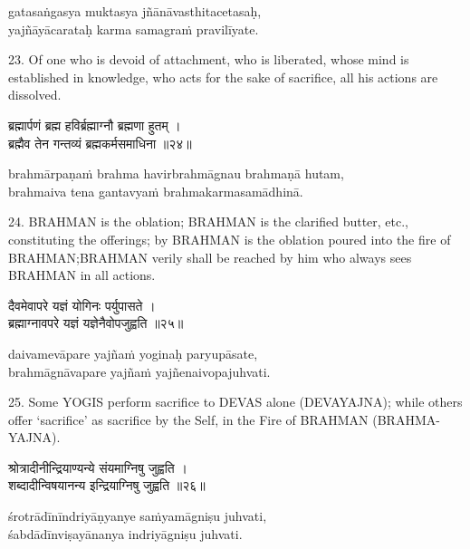 \begin{transliteration}
gatasaṅgasya muktasya jñānāvasthitacetasaḥ, \\
yajñāyācarataḥ karma samagraṁ pravilīyate.
\end{transliteration}

23. Of one who is devoid of attachment, who is liberated, whose mind is
established in knowledge, who acts for the sake of sacrifice, all his actions
are dissolved.

\begin{gitaverse}
ब्रह्मार्पणं ब्रह्म हविर्ब्रह्माग्नौ ब्रह्मणा हुतम् । \\
ब्रह्मैव तेन गन्तव्यं ब्रह्मकर्मसमाधिना ॥२४॥
\end{gitaverse}

\begin{transliteration}
brahmārpaṇaṁ brahma havirbrahmāgnau brahmaṇā hutam, \\
brahmaiva tena gantavyaṁ brahmakarmasamādhinā.
\end{transliteration}

24. BRAHMAN is the oblation; BRAHMAN is the clarified butter, etc.,
constituting the offerings; by BRAHMAN is the oblation poured into the fire of
BRAHMAN;\@ BRAHMAN verily shall be reached by him who always sees BRAHMAN in
all actions.

\begin{gitaverse}
दैवमेवापरे यज्ञं योगिनः पर्युपासते । \\
ब्रह्माग्नावपरे यज्ञं यज्ञेनैवोपजुह्वति ॥२५॥
\end{gitaverse}

\begin{transliteration}
daivamevāpare yajñaṁ yoginaḥ paryupāsate, \\
brahmāgnāvapare yajñaṁ yajñenaivopajuhvati.
\end{transliteration}

25. Some YOGIS perform sacrifice to DEVAS alone (DEVAYAJNA); while others offer
`sacrifice' as sacrifice by the Self, in the Fire of BRAHMAN (BRAHMA-YAJNA).

\begin{gitaverse}
श्रोत्रादीनीन्द्रियाण्यन्ये संयमाग्निषु जुह्वति । \\
शब्दादीन्विषयानन्य इन्द्रियाग्निषु जुह्वति ॥२६॥
\end{gitaverse}

\begin{transliteration}
śrotrādīnīndriyāṇyanye saṁyamāgniṣu juhvati, \\
śabdādīnviṣayānanya indriyāgniṣu juhvati.
\end{transliteration}

